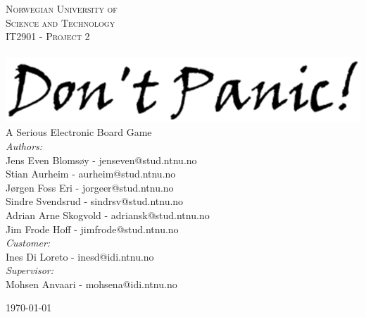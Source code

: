 \begin{center}



\textsc{\LARGE Norwegian University of\\ Science and Technology}\\[1.5cm]

\textsc{\Large IT2901 - Project 2}\\[0.5cm]

\HRule \\[0.4cm]
{%
	\includegraphics[width=1.0\textwidth]{img/dontpaniclogo}\\[0.4cm]}
	A Serious Electronic Board Game
\HRule \\[1.5cm]


	\emph{Authors:}\\
	Jens Even Blomsøy 		- 	jenseven@stud.ntnu.no\\
	Stian Aurheim 		- 	aurheim@stud.ntnu.no\\
	Jørgen Foss Eri 		-	jorgeer@stud.ntnu.no\\
	Sindre Svendsrud 		-	sindrsv@stud.ntnu.no\\
	Adrian Arne Skogvold 	- 	adriansk@stud.ntnu.no\\
	Jim Frode Hoff 		- 	jimfrode@stud.ntnu.no\\
	\vspace{10 mm}
	\emph{Customer:} \\
	Ines Di Loreto		- 	inesd@idi.ntnu.no\\
	\vspace{10 mm}
	\emph{Supervisor:} \\
	Mohsen Anvaari		-	mohsena@idi.ntnu.no\\

\vfill

{\large \today}

\end{center}
\pagebreak
